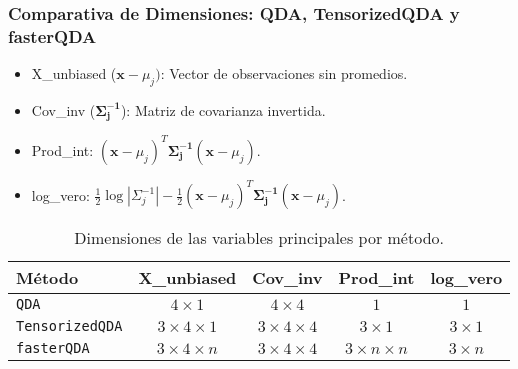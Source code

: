 \documentclass{beamer}
\begin{document}
\begin{frame}
  \frametitle{Comparativa de Dimensiones: QDA, TensorizedQDA y fasterQDA}

  \begin{itemize}
    \item X\_unbiased (\(\mathbf{x} - \mu_j)\): Vector de observaciones sin promedios.
    \item Cov\_inv (\(\mathbf{\Sigma_j^{-1}}\)): Matriz de covarianza invertida.
    \item Prod\_int: \((\mathbf{x} - \mu_j)^T \mathbf{\Sigma_j^{-1}} (\mathbf{x} - \mu_j)\).
    \item log\_vero: \( \frac{1}{2} \log{\left|\Sigma_j^{-1}\right|} - \frac{1}{2} (\mathbf{x} - \mu_j)^T \mathbf{\Sigma_j^{-1}} (\mathbf{x} - \mu_j)\).


  \end{itemize}

  \begin{table}[h!]
    \centering
    \begin{tabular}{@{}lcccc@{}}
      \toprule
      \textbf{Método}     		  & X\_unbiased 				 	&Cov\_inv 				 & Prod\_int				& 	 log\_vero		 	 \\ 
      \midrule
      \texttt{QDA}         		 & \(4 \times 1\)              		    & \(4 \times 4\)           		 & \(1\)            			& 	 \(1\)				 \\ 
      \texttt{TensorizedQDA}	 & \(3 \times 4 \times 1\)           & \(3 \times 4 \times 4\)     & \(3 \times 1 \)		 	& 	 \(3 \times 1\)		\\ 
      \texttt{fasterQDA}  	  	 & \(3 \times 4 \times n\)           & \(3 \times 4 \times 4\)     & \(3 \times n \times n\) & 	\(3 \times n \) 		\\ 
      \bottomrule
    \end{tabular}
    \caption{Dimensiones de las variables principales por método.}
  \end{table}

\end{frame}
\end{document}
